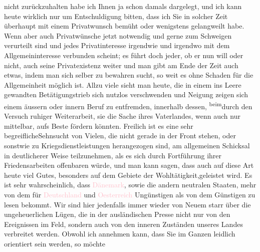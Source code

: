                     nicht zurückzuhalten habe ich Ihnen ja 
               schon damals dargelegt\introOben{},\introOben{} und ich kann heute wirklich nur um Entschuldigung
                    bitten, dass ich Sie in solcher Zeit überhaupt mit einem Privatwunsch bemüht
                    oder wenigstens gelangweilt habe. Wenn aber auch Privatwünsche jetzt notwendig
                    und gerne zum Schweigen verurteilt sind und jedes Privatinteresse irgendwie und
                    irgendwo mit dem Allgemeininteresse verbunden scheint; es führt {\pb}doch jeder, ob er nun will oder nicht, auch
                    seine Privatexistenz weiter und man gibt am Ende der Zeit auch etwas, indem man
                    sich selber zu bewahren sucht, so weit es ohne Schaden für die Allgemeinheit
                    möglich ist. Allzu viele sieht man heute, die in einem ins Leere gewandten
                    Betätigungstrieb sich nutzlos verschwenden und Neigung zeigen sich einem äussern
                    oder innern Beruf zu entfremden, innerhalb dessen, \substVorne{}\textsuperscript{beim}\substDazwischen{}durch den\substHinten{} Versuch ruhiger Weiterarbeit, sie die Sache ihres Vaterlandes, wenn
                    auch nur mittelbar, aufs Beste fördern könnten. Freilich ist \introOben{}es eine sehr begreifliche\introOben{}Sehnsucht
                    von Vielen, die nicht gerade in der Front stehen, oder sonstwie zu
                    Kriegsdienstleistungen herangezogen sind, am allgemeinen Schicksal in
                    deutlicherer Weise teilzunehmen, als es sich durch Fortführung ihrer
                    Friedensarbeiten offenbaren würde, und man kann sagen, dass auch auf diese Art
                    heute viel Gutes, besonders auf dem Gebiete der Wohltätigkeit,geleistet
                    wird.\pend
           \pstart
           Es ist sehr wahrscheinlich, dass {\pb}\textcolor{pink}{Dänemark}{}\ledrightnote{\textcolor{pink}{Dänemark}}, sowie die andern neutralen Staaten,
                    mehr von dem für \textcolor{pink}{Deutschland}{}\ledrightnote{\textcolor{pink}{Deutschland}} und \textcolor{pink}{Oesterreich}{}\ledrightnote{\textcolor{pink}{Österreich}} Ungünstigen als von dem Günstigen
                    zu lesen bekommt. Wir sind hier jedenfalls immer wieder von Neuem starr über die
                    ungeheuerlichen Lügen, die in der ausländischen Presse nicht nur von den
                    Ereignissen im Feld, sondern auch von den inneren Zuständen unseres Landes
                    verbreitet werden. Obwohl ich annehmen kann, dass Sie im Ganzen \label{LL710-1v}\label{LL710-1h}leidlich orientiert sein werden, so möchte
